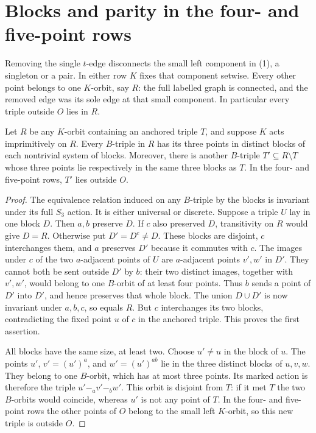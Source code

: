 \documentclass[a4paper,11pt]{article}
\begin{document}
\section{Blocks and parity in the four- and five-point rows}
Removing the single $t$-edge disconnects the small left component in
(1), a singleton or a pair. In either row $K$ fixes that component setwise.
Every other point belongs to one $K$-orbit, say $R$: the full labelled
graph is connected, and the removed edge was its sole edge at that small
component. In particular every triple outside $O$ lies in $R$.

\begin{lemma}\label{blocks}
Let $R$ be any $K$-orbit containing an anchored triple $T$, and suppose
$K$ acts imprimitively on $R$. Every $B$-triple in $R$ has its three
points in distinct blocks of each nontrivial system of blocks.
Moreover, there is another $B$-triple $T'\subseteq R\setminus T$
whose three points lie respectively in the same three blocks as $T$.
In the four- and five-point rows, $T'$ lies outside $O$.
\end{lemma}
\begin{proof}
The equivalence relation induced on any $B$-triple by the blocks is
invariant under its full $S_3$ action. It is either universal or discrete.
Suppose a triple $U$ lay in one block $D$. Then $a,b$ preserve $D$.
If $c$ also preserved $D$, transitivity on $R$ would give $D=R$.
Otherwise put $D'=D^c\ne D$. These blocks are disjoint, $c$ interchanges
them, and $a$ preserves $D'$ because it commutes with $c$.
The images under $c$ of the two $a$-adjacent points of $U$ are
$a$-adjacent points $v',w'$ in $D'$. They cannot both be sent outside
$D'$ by $b$: their two distinct images, together with $v',w'$, would
belong to one $B$-orbit of at least four points. Thus $b$ sends a point
of $D'$ into $D'$, and hence preserves that whole block. The union
$D\cup D'$ is now invariant under $a,b,c$, so equals $R$.
But $c$ interchanges its two blocks, contradicting the fixed point $u$
of $c$ in the anchored triple. This proves the first assertion.

All blocks have the same size, at least two. Choose $u'\ne u$ in the
block of $u$. The points $u'$, $v'=(u')^a$, and $w'=(u')^{ab}$ lie in
the three distinct blocks of $u,v,w$. They belong to one $B$-orbit, which
has at most three points. Its marked action is therefore the triple
$u'\mathrel{-_a}v'\mathrel{-_b}w'$. This orbit is disjoint from $T$:
if it met $T$ the two $B$-orbits would coincide, whereas $u'$ is not any
point of $T$. In the four- and five-point rows the other points of $O$
belong to the small left $K$-orbit, so this new triple is outside $O$.
\end{proof}
\end{document}
